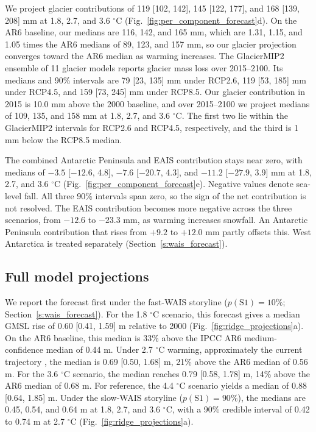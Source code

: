 \documentclass[draft,linenumbers]{agujournal2025}
\begin{document}
We project glacier contributions of 119 [102, 142], 145 [122, 177], and 168 [139, 208] mm at 1.8, 2.7, and 3.6 $^\circ$C (Fig.~\ref{fig:per_component_forecast}d). On the AR6 baseline, our medians are 116, 142, and 165 mm, which are 1.31, 1.15, and 1.05 times the AR6 medians of 89, 123, and 157 mm, so our glacier projection converges toward the AR6 median as warming increases. The GlacierMIP2 ensemble of 11 glacier models \citep{Marzeion2020} reports glacier mass loss over 2015--2100. Its medians and 90\% intervals are 79 [23, 135] mm under RCP2.6, 119 [53, 185] mm under RCP4.5, and 159 [73, 245] mm under RCP8.5. Our glacier contribution in 2015 is 10.0 mm above the 2000 baseline, and over 2015--2100 we project medians of 109, 135, and 158 mm at 1.8, 2.7, and 3.6 $^\circ$C. The first two lie within the GlacierMIP2 intervals for RCP2.6 and RCP4.5, respectively, and the third is 1 mm below the RCP8.5 median.

The combined Antarctic Peninsula and EAIS contribution stays near zero, with medians of $-3.5$ [$-12.6$, 4.8], $-7.6$ [$-20.7$, 4.3], and $-11.2$ [$-27.9$, 3.9] mm at 1.8, 2.7, and 3.6 $^\circ$C (Fig.~\ref{fig:per_component_forecast}e). Negative values denote sea-level fall. All three 90\% intervals span zero, so the sign of the net contribution is not resolved. The EAIS contribution becomes more negative across the three scenarios, from $-12.6$ to $-23.3$ mm, as warming increases snowfall. An Antarctic Peninsula contribution that rises from $+9.2$ to $+12.0$ mm partly offsets this. West Antarctica is treated separately (Section~\ref{s:wais_forecast}).


\subsection{Full model projections}

We report the forecast first under the fast-WAIS storyline ($p(\mathrm{S1}) = 10\%$; Section~\ref{s:wais_forecast}). For the 1.8 $^\circ$C scenario, this forecast gives a median GMSL rise of 0.60 [0.41, 1.59] m relative to 2000 (Fig.~\ref{fig:ridge_projections}a). On the AR6 baseline, this median is 33\% above the IPCC AR6 medium-confidence median of 0.44 m. Under 2.7 $^\circ$C warming, approximately the current trajectory \citep{Hausfather2025}, the median is 0.69 [0.50, 1.68] m, 21\% above the AR6 median of 0.56 m. For the 3.6 $^\circ$C scenario, the median reaches 0.79 [0.58, 1.78] m, 14\% above the AR6 median of 0.68 m. For reference, the 4.4 $^\circ$C scenario yields a median of 0.88 [0.64, 1.85] m. Under the slow-WAIS storyline ($p(\mathrm{S1}) = 90\%$), the medians are 0.45, 0.54, and 0.64 m at 1.8, 2.7, and 3.6 $^\circ$C, with a 90\% credible interval of 0.42 to 0.74 m at 2.7 $^\circ$C (Fig.~\ref{fig:ridge_projections}a).
\end{document}
